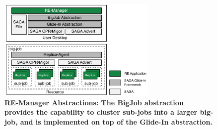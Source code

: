\documentclass{rspublic}
\begin{document}
\begin{figure}[t]
    \begin{center}  
      \includegraphics[width=0.68\textwidth]{remdmanager_v12}
      \caption{\footnotesize \bf RE-Manager Abstractions: The BigJob
          abstraction provides the capability to cluster sub-jobs into a
          larger big-job, and is implemented on top of the Glide-In
          abstraction.\vspace*{-3em}}
     \label{fig:abstractions} 
    \end{center}
\end{figure}




    

\end{document}
